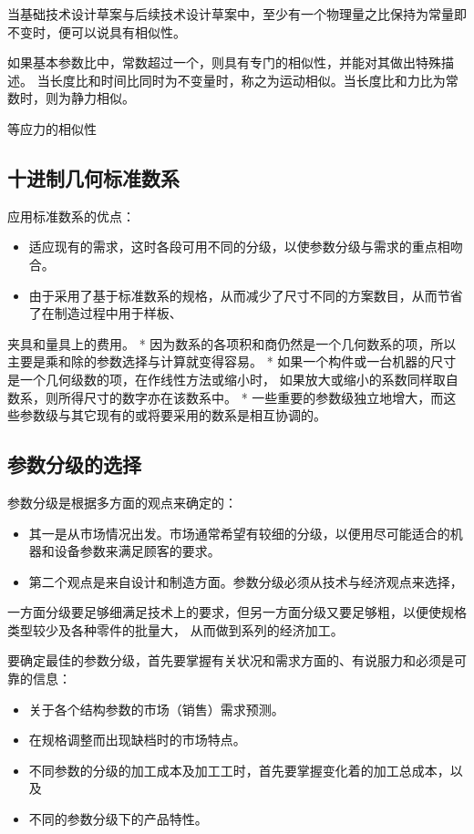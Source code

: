 \documentclass[letterpaper,10pt,english]{sphinxmanual}
\begin{document}
当基础技术设计草案与后续技术设计草案中，至少有一个物理量之比保持为常量即不变时，便可以说具有相似性。

如果基本参数比中，常数超过一个，则具有专门的相似性，并能对其做出特殊描述。
当长度比和时间比同时为不变量时，称之为运动相似。当长度比和力比为常数时，则为静力相似。

等应力的相似性


\subsection{十进制几何标准数系}
\label{unit7:id4}
应用标准数系的优点：
\begin{itemize}
\item {} 
适应现有的需求，这时各段可用不同的分级，以使参数分级与需求的重点相吻合。

\item {} 
由于采用了基于标准数系的规格，从而减少了尺寸不同的方案数目，从而节省了在制造过程中用于样板、

\end{itemize}

夹具和量具上的费用。
* 因为数系的各项积和商仍然是一个几何数系的项，所以主要是乘和除的参数选择与计算就变得容易。
* 如果一个构件或一台机器的尺寸是一个几何级数的项，在作线性方法或缩小时，
如果放大或缩小的系数同样取自数系，则所得尺寸的数字亦在该数系中。
* 一些重要的参数级独立地增大，而这些参数级与其它现有的或将要采用的数系是相互协调的。


\subsection{参数分级的选择}
\label{unit7:id5}
参数分级是根据多方面的观点来确定的：
\begin{itemize}
\item {} 
其一是从市场情况出发。市场通常希望有较细的分级，以便用尽可能适合的机器和设备参数来满足顾客的要求。

\item {} 
第二个观点是来自设计和制造方面。参数分级必须从技术与经济观点来选择，

\end{itemize}

一方面分级要足够细满足技术上的要求，但另一方面分级又要足够粗，以便使规格类型较少及各种零件的批量大，
从而做到系列的经济加工。

要确定最佳的参数分级，首先要掌握有关状况和需求方面的、有说服力和必须是可靠的信息：
\begin{itemize}
\item {} 
关于各个结构参数的市场（销售）需求预测。

\item {} 
在规格调整而出现缺档时的市场特点。

\item {} 
不同参数的分级的加工成本及加工工时，首先要掌握变化着的加工总成本，以及

\item {} 
不同的参数分级下的产品特性。

\end{itemize}
\end{document}
